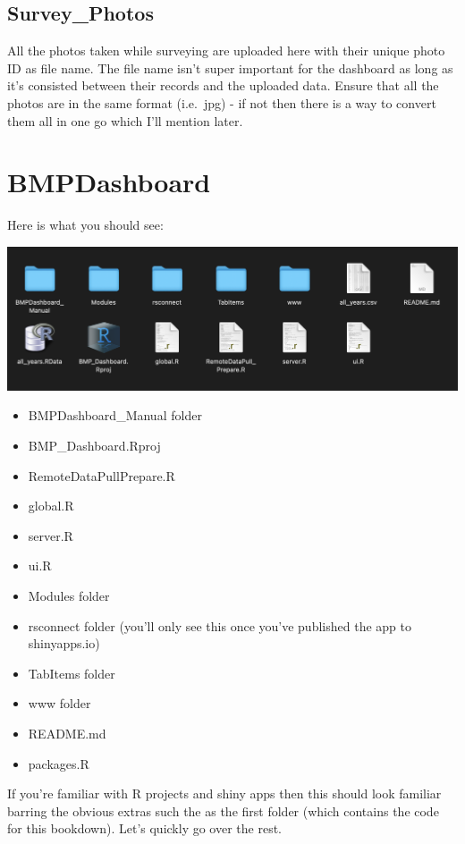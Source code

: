 \documentclass[
]{book}
\theoremstyle{definition}
\theoremstyle{definition}
\theoremstyle{definition}
\theoremstyle{definition}
\theoremstyle{remark}
\begin{document}
\hypertarget{survey_photos}{%
\subsection{Survey\_Photos}\label{survey_photos}}

All the photos taken while surveying are uploaded here with their unique photo ID as file name. The file name isn't super important for the dashboard as long as it's consisted between their records and the uploaded data. Ensure that all the photos are in the same format (i.e.~jpg) - if not then there is a way to convert them all in one go which I'll mention later.

\hypertarget{bmpdashboard}{%
\section{BMPDashboard}\label{bmpdashboard}}

Here is what you should see:

\includegraphics{images/BMPDashboard.png}

\begin{itemize}
\item
  BMPDashboard\_Manual folder
\item
  BMP\_Dashboard.Rproj
\item
  RemoteDataPullPrepare.R
\item
  global.R
\item
  server.R
\item
  ui.R
\item
  Modules folder
\item
  rsconnect folder (you'll only see this once you've published the app to shinyapps.io)
\item
  TabItems folder
\item
  www folder
\item
  README.md
\item
  packages.R
\end{itemize}

If you're familiar with R projects and shiny apps then this should look familiar barring the obvious extras such the as the first folder (which contains the code for this bookdown). Let's quickly go over the rest.
\end{document}
